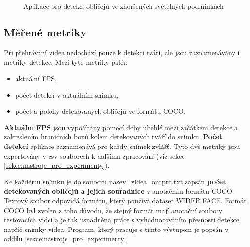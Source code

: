 \begin{figure}[H]
  \begin{center}
  \label{obrazek:gui}
  \caption{Aplikace pro detekci obličejů ve zhoršených světelných podmínkách}
  \end{center}
\end{figure}

\subsection*{Měřené metriky}
Při přehrávání videa nedochází pouze k detekci tváří, ale jsou zaznamenávány i metriky detekce. Mezi tyto metriky patří:

\begin{itemize}
  \item aktuální FPS,
  \item počet detekcí v aktuálním snímku,
  \item počet a polohy detekovaných obličejů ve formátu COCO.
\end{itemize}

\textbf{Aktuální FPS} jsou vypočítány pomocí doby uběhlé mezi začátkem detekce a zakreslením hraničních boxů kolem detekovaných tváří do snímku. 
\textbf{Počet detekcí} aplikace zaznamenává pro každý snímek zvlášť. Tyto dvě metriky jsou exportovány v csv souborech k dalšímu zpracování (viz sekce \ref{sekce:nastroje_pro_experimenty}).

Ke každému snímku je do souboru nazev\_videa\_output.txt zapsán \textbf{počet detekovaných obličejů a jejich souřadnice} v anotačním formátu COCO. Textový soubor odpovídá formátu, který používá dataset WIDER FACE. Formát COCO byl zvolen z toho důvodu, že stejný formát mají anotační soubory testovacích videí a je tak usnadněna práce s vyhodnocováním přesnosti detekce napříč snímky videa. Program, který pracuje s tímto výstupem je popsán v oddílu \ref{sekce:nastroje_pro_experimenty}.


